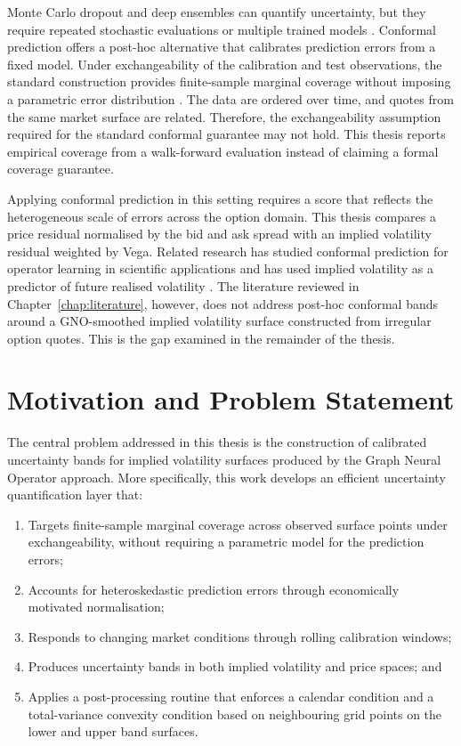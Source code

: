 Monte Carlo dropout and deep ensembles can quantify uncertainty, but they require repeated stochastic evaluations or multiple trained models \cite{gal2016dropout,lakshminarayanan2017simple}. Conformal prediction offers a post-hoc alternative that calibrates prediction errors from a fixed model. Under exchangeability of the calibration and test observations, the standard construction provides finite-sample marginal coverage without imposing a parametric error distribution \cite{shafer2008tutorial,angelopoulos2023gentle}. The data are ordered over time, and quotes from the same market surface are related. Therefore, the exchangeability assumption required for the standard conformal guarantee may not hold. This thesis reports empirical coverage from a walk-forward evaluation instead of claiming a formal coverage guarantee.

Applying conformal prediction in this setting requires a score that reflects the heterogeneous scale of errors across the option domain. This thesis compares a price residual normalised by the bid and ask spread with an implied volatility residual weighted by Vega. Related research has studied conformal prediction for operator learning in scientific applications \cite{ma2024calibrated} and has used implied volatility as a predictor of future realised volatility \cite{canete2023market}. The literature reviewed in Chapter~\ref{chap:literature}, however, does not address post-hoc conformal bands around a GNO-smoothed implied volatility surface constructed from irregular option quotes. This is the gap examined in the remainder of the thesis.

\section{Motivation and Problem Statement}
\label{sec:motivation}

The central problem addressed in this thesis is the construction of calibrated uncertainty bands for implied volatility surfaces produced by the Graph Neural Operator approach. More specifically, this work develops an efficient uncertainty quantification layer that:

\begin{enumerate}
    \item Targets finite-sample marginal coverage across observed surface points under exchangeability, without requiring a parametric model for the prediction errors;
    \item Accounts for heteroskedastic prediction errors through economically motivated normalisation;
    \item Responds to changing market conditions through rolling calibration windows;
    \item Produces uncertainty bands in both implied volatility and price spaces; and
    \item Applies a post-processing routine that enforces a calendar condition and a total-variance convexity condition based on neighbouring grid points on the lower and upper band surfaces.
\end{enumerate}

